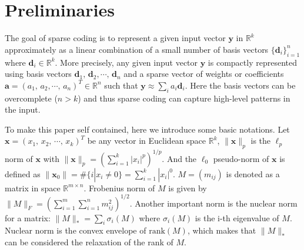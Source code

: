 \section{Preliminaries}
\label{sec:preliminaries}
The goal of sparse coding is to represent a given input vector $\mathbf{y}$ in $\mathbb{R}^k$ approximately as a linear combination of a small number of basis vectors $\{\mathbf{d}_i\}_{i=1}^n$ where $\mathbf{d}_i \in\mathbb{R}^k$.
More precisely, any given input vector $\mathbf{y}$ is compactly represented using basis vectors $\mathbf{d}_1,\,\mathbf{d}_2,\cdots,\,\mathbf{d}_n$ and a sparse vector of weights or coefficients $\mathbf{a}=(a_1,\,a_2,\cdots ,\,a_n)^T\in \mathbb{R}^n$ such that $\mathbf{y} \approx \sum_i a_i\mathbf{d}_i$.
Here the basis vectors can be overcomplete ($n>k$) and thus sparse coding can capture high-level patterns in the input.

To make this paper self contained, here we introduce some basic notations.
Let $\mathbf{x}=(x_1,\,x_2,\,\cdots ,\,x_k)^T$ be any vector in Euclidean space $\mathbb{R}^k$, $\|\mathbf{x}\|_p$  is the $\ell_p$ norm of $\mathbf{x}$ with $\|\mathbf{x}\|_p=(\sum_{i=1}^k |x_i|^p)^{1/p}$. And the $\ell_0$ pseudo-norm of $\mathbf{x}$ is defined as $\|\mathbf{x}_0\|=\#\{i|x_i\neq 0\}=\sum_{i=1}^k |x_i|^0$.
$M=(m_{ij})$ is denoted as a matrix in space $\mathbb{R}^{m\times n}$.
Frobenius norm of $M$ is given by $\|M\|_F=(\sum_{i=1}^m\sum_{i=1}^n m_{ij}^2)^{1/2}$.
Another important norm is the nuclear norm for a matrix: $\|M\|_* = \sum_i \sigma_i(M)$ where $\sigma_i(M)$ is the i-th eigenvalue of $M$.
Nuclear norm is the convex envelope of $\mathrm{rank}(M)$, which makes that $\|M\|_*$ can be considered the relaxation of the rank of $M$.
